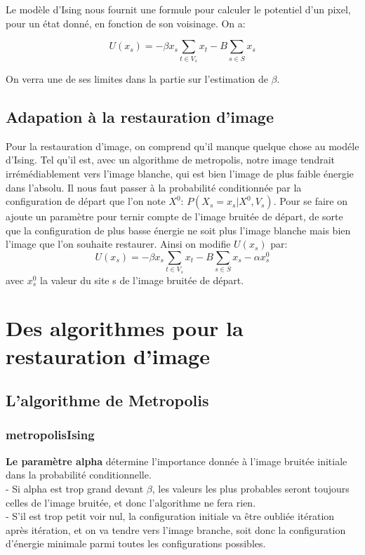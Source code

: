 \documentclass[
]{article}
\begin{document}
Le modèle d'Ising nous fournit une formule pour calculer le potentiel
d'un pixel, pour un état donné, en fonction de son voisinage. On a:

\[U(x_s) = -\beta x_s \sum_{t\in V_s}{x_t} -B\sum_{s\in S}{x_s}\]

On verra une de ses limites dans la partie sur l'estimation de
\(\beta\).

\hypertarget{adapation-uxe0-la-restauration-dimage}{%
\subsection{Adapation à la restauration
d'image}\label{adapation-uxe0-la-restauration-dimage}}

Pour la restauration d'image, on comprend qu'il manque quelque chose au
modéle d'Ising. Tel qu'il est, avec un algorithme de metropolis, notre
image tendrait irrémédiablement vers l'image blanche, qui est bien
l'image de plus faible énergie dans l'absolu. Il nous faut passer à la
probabilité conditionnée par la configuration de départ que l'on note
\(X^0\): \(P(X_s=x_s|X^0,V_s)\). Pour se faire on ajoute un paramètre
pour ternir compte de l'image bruitée de départ, de sorte que la
configuration de plus basse énergie ne soit plus l'image blanche mais
bien l'image que l'on souhaite restaurer. Ainsi on modifie \(U(x_s)\)
par:
\[ U(x_s) = -\beta x_s \sum_{t\in V_s}{x_t} -B\sum_{s\in S}{x_s} -\alpha x_s^0\]
avec \(x_s^0\) la valeur du site s de l'image bruitée de départ.

\hypertarget{des-algorithmes-pour-la-restauration-dimage}{%
\section{Des algorithmes pour la restauration
d'image}\label{des-algorithmes-pour-la-restauration-dimage}}

\hypertarget{lalgorithme-de-metropolis}{%
\subsection{L'algorithme de
Metropolis}\label{lalgorithme-de-metropolis}}

\hypertarget{metropolisising}{%
\subsubsection{metropolisIsing}\label{metropolisising}}

\textbf{Le paramètre alpha} détermine l'importance donnée à l'image
bruitée initiale dans la probabilité conditionnelle.\\
- Si alpha est trop grand devant \(\beta\), les valeurs les plus
probables seront toujours celles de l'image bruitée, et donc
l'algorithme ne fera rien.\\
- S'il est trop petit voir nul, la configuration initiale va être
oubliée itération après itération, et on va tendre vers l'image branche,
soit donc la configuration d'énergie minimale parmi toutes les
configurations possibles.
\end{document}
